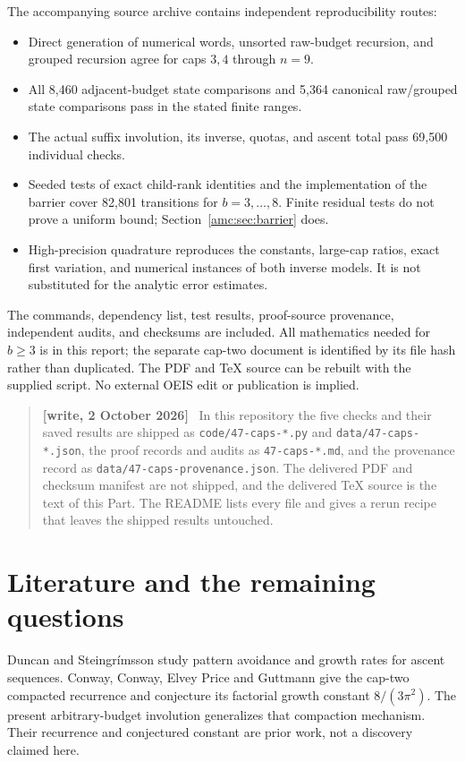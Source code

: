 \documentclass[11pt,letterpaper]{article}
\theoremstyle{remark}\newtheorem{remark}[theorem]{Remark}
\newenvironment{writenote}{\par\smallskip\begin{quote}\small\textbf{[write, 2 October 2026]}\ }{\end{quote}\smallskip}
\newcommand{\repopath}[1]{\nolinkurl{#1}}
\begin{document}
The accompanying source archive contains independent reproducibility routes:
\begin{itemize}
\item Direct generation of numerical words, unsorted raw-budget recursion, and grouped recursion agree for caps $3,4$ through $n=9$.
\item All 8,460 adjacent-budget state comparisons and 5,364 canonical raw/grouped state comparisons pass in the stated finite ranges.
\item The actual suffix involution, its inverse, quotas, and ascent total pass 69,500 individual checks.
\item Seeded tests of exact child-rank identities and the implementation of the barrier cover 82,801 transitions for $b=3,\ldots,8$. Finite residual tests do not prove a uniform bound; Section~\ref{amc:sec:barrier} does.
\item High-precision quadrature reproduces the constants, large-cap ratios, exact first variation, and numerical instances of both inverse models. It is not substituted for the analytic error estimates.
\end{itemize}
The commands, dependency list, test results, proof-source provenance, independent audits, and checksums are included. All mathematics needed for $b\ge3$ is in this report; the separate cap-two document is identified by its file hash rather than duplicated. The PDF and \TeX{} source can be rebuilt with the supplied script. No external OEIS edit or publication is implied.
\begin{writenote}
In this repository the five checks and their saved results are shipped as \repopath{code/47-caps-*.py} and \repopath{data/47-caps-*.json}, the proof records and audits as \repopath{47-caps-*.md}, and the provenance record as \repopath{data/47-caps-provenance.json}. The delivered PDF and checksum manifest are not shipped, and the delivered \TeX{} source is the text of this Part. The README lists every file and gives a rerun recipe that leaves the shipped results untouched.
\end{writenote}

\section{Literature and the remaining questions}\label{amc:sec:scope}
Duncan and Steingr\'imsson \cite{DS} study pattern avoidance and growth rates for ascent sequences. Conway, Conway, Elvey Price and Guttmann \cite{CCEG} give the cap-two compacted recurrence and conjecture its factorial growth constant $8/(3\pi^2)$. The present arbitrary-budget involution generalizes that compaction mechanism. Their recurrence and conjectured constant are prior work, not a discovery claimed here.
\end{document}
